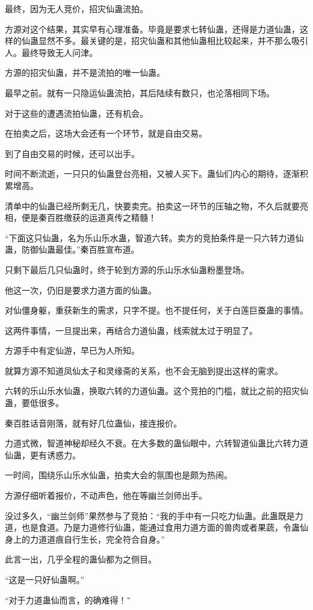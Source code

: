 \begin{this_body}
最终，因为无人竞价，招灾仙蛊流拍。

方源对这个结果，其实早有心理准备。毕竟是要求七转仙蛊，还得是力道仙蛊，这样的仙蛊显然不多。最关键的是，招灾仙蛊和其他仙蛊相比较起来，并不那么吸引人。最终导致无人问津。

方源的招灾仙蛊，并不是流拍的唯一仙蛊。

最早之前。就有一只隐运仙蛊流拍，其后陆续有数只，也沦落相同下场。

对于这些的遭遇流拍仙蛊，还有机会。

在拍卖之后，这场大会还有一个环节，就是自由交易。

到了自由交易的时候，还可以出手。

时间不断流逝，一只只的仙蛊登台亮相，又被人买下。蛊仙们内心的期待，逐渐积累增高。

清单中的仙蛊已经所剩无几，快要卖完。拍卖这一环节的压轴之物，不久后就要亮相，便是秦百胜缴获的运道真传之精髓！

“下面这只仙蛊，名为乐山乐水蛊，智道六转。卖方的竞拍条件是一只六转力道仙蛊，防御仙蛊最佳。”秦百胜宣布道。

只剩下最后几只仙蛊时，终于轮到方源的乐山乐水仙蛊粉墨登场。

他这一次，仍旧是要求力道方面的仙蛊。

对仙僵身躯，重获新生的需求，只字不提。也不提任何，关于白莲巨蚕蛊的事情。

这两件事情，一旦提出来，再结合力道仙蛊，线索就太过于明显了。

方源手中有定仙游，早已为人所知。

就算方源不知道凤仙太子和灵缘斋的关系，也不会无脑到提出这样的需求。

六转的乐山乐水仙蛊，换取六转的力道仙蛊。这个竞拍的门槛，就比之前的招灾仙蛊，要低很多。

秦百胜话音刚落，就有好几位蛊仙，接连报价。

力道式微，智道神秘却经久不衰。在大多数的蛊仙眼中，六转智道仙蛊比六转力道仙蛊，更有诱惑力。

一时间，围绕乐山乐水仙蛊，拍卖大会的氛围也是颇为热闹。

方源仔细听着报价，不动声色，他在等幽兰剑师出手。

没过多久，“幽兰剑师”果然参与了竞拍：“我的手中有一只吃力仙蛊。此蛊既是力道，也是食道。乃是力道修行仙蛊，能通过食用力道方面的兽肉或者果蔬，令蛊仙身上的力道道痕自行生长，完全符合自身。”

此言一出，几乎全程的蛊仙都为之侧目。

“这是一只好仙蛊啊。”

“对于力道蛊仙而言，的确难得！”


\end{this_body}
